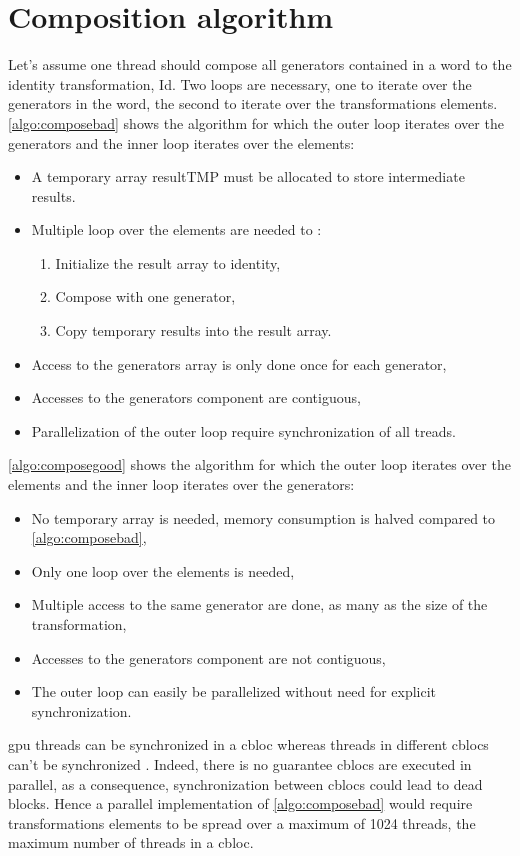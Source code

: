 {\section{Composition algorithm}
\label{part:compose}
Let's assume one thread should compose all generators contained in a word to the identity transformation, Id. Two loops are necessary, one to iterate over the generators in the word, the second to iterate over the transformations elements.
\autoref{algo:composebad} shows the algorithm for which the outer loop iterates over the generators and the inner loop iterates over the elements:
\begin{itemize}
\item A temporary array resultTMP must be allocated to store intermediate results.
\item Multiple loop over the elements are needed to :
\begin{enumerate}
 \item Initialize the result array to identity,
 \item Compose with one generator,
 \item Copy temporary results into the result array.
 \end{enumerate}
\item Access to the generators array is only done once for each generator,
 \item Accesses to the generators component are contiguous,
 \item Parallelization of the outer loop require synchronization of all treads.
\end{itemize}
\autoref{algo:composegood} shows the algorithm for which the outer loop iterates over the elements and the inner loop iterates over the generators:
\begin{itemize}
 \item No temporary array is needed, memory consumption is halved compared to \autoref{algo:composebad},
 \item Only one loop over the elements is needed,
 \item Multiple access to the same generator are done, as many as the size of the transformation,
 \item Accesses to the generators component are not contiguous,
 \item The outer loop can easily be parallelized without need for explicit synchronization.
\end{itemize}
\gls{gpu} threads can be synchronized in a \gls{cbloc} whereas threads in different \glspl{cbloc} can't be synchronized \cite{doccuda}. Indeed, there is no guarantee \glspl{cbloc} are executed in parallel, as a consequence, synchronization between \glspl{cbloc} could lead to dead blocks. Hence a parallel implementation of \autoref{algo:composebad} would require transformations elements to be spread over a maximum of 1024 threads, the maximum number of threads in a \gls{cbloc}.

}

